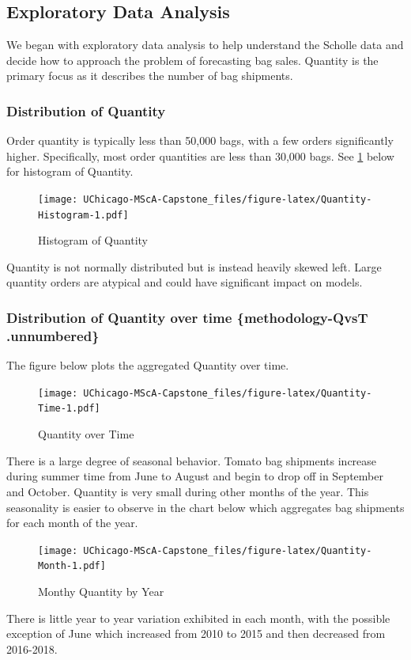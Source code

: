 \documentclass[12pt,oneside]{chicagocapstone}
\begin{document}
\subsection*{Exploratory Data Analysis}\label{methodology-EDA}

We began with exploratory data analysis to help understand the Scholle
data and decide how to approach the problem of forecasting bag sales.
Quantity is the primary focus as it describes the number of bag
shipments.

\subsubsection*{Distribution of
Quantity}\label{methodology-EDA-Distr-Quantity}

Order quantity is typically less than 50,000 bags, with a few orders
significantly higher. Specifically, most order quantities are less than
30,000 bags. See \ref{fig:Quantity-Histogram} below for histogram of
Quantity.
\begin{figure}
\centering
\texttt{[image: UChicago-MScA-Capstone\_files/figure-latex/Quantity-Histogram-1.pdf]}
\caption{\label{fig:Quantity-Histogram}Histogram of Quantity}
\end{figure}
Quantity is not normally distributed but is instead heavily skewed left.
Large quantity orders are atypical and could have significant impact on
models.

\subsubsection{Distribution of Quantity over time \{methodology-QvsT
.unnumbered\}}\label{distribution-of-quantity-over-time-methodology-qvst-.unnumbered}

The figure below plots the aggregated Quantity over time.
\begin{figure}
\centering
\texttt{[image: UChicago-MScA-Capstone\_files/figure-latex/Quantity-Time-1.pdf]}
\caption{\label{fig:Quantity-Time}Quantity over Time}
\end{figure}
There is a large degree of seasonal behavior. Tomato bag shipments
increase during summer time from June to August and begin to drop off in
September and October. Quantity is very small during other months of the
year. This seasonality is easier to observe in the chart below which
aggregates bag shipments for each month of the year.
\begin{figure}
\centering
\texttt{[image: UChicago-MScA-Capstone\_files/figure-latex/Quantity-Month-1.pdf]}
\caption{\label{fig:Quantity-Month}Monthy Quantity by Year}
\end{figure}
There is little year to year variation exhibited in each month, with the
possible exception of June which increased from 2010 to 2015 and then
decreased from 2016-2018.
\end{document}
